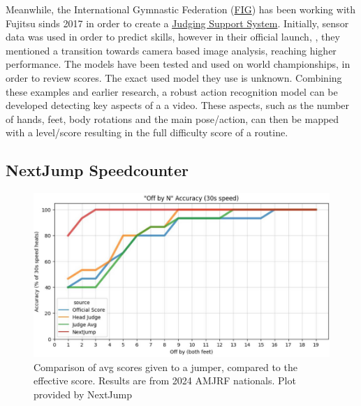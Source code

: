 Meanwhile, the International Gymnastic Federation (\href{https://www.gymnastics.sport/site/}{FIG}) has been working with Fujitsu sinds 2017 in order to create a \href{https://www.fujitsu.com/global/themes/data-driven/judging-support-system/}{Judging Support System}. Initially, sensor data was used in order to predict skills, however in their official launch, \autocite{Fujitsu2023launch}, they mentioned a transition towards camera based image analysis, reaching higher performance. The models have been tested and used on world championships, in order to review scores. The exact used model they use is unknown.
Combining these examples and earlier research, a robust action recognition model can be developed detecting key aspects of a a video. These aspects, such as the number of hands, feet, body rotations and the main pose/action, can then be mapped with a level/score resulting in the full difficulty score of a routine.

\subsection{NextJump Speedcounter}
\label{lit:nextjump-speedcounter}


\begin{figure}
    \centering
    \includegraphics[width=0.95\linewidth]{img/nextjump-off-by-feet-judges}
    \caption[nextjump-results-multi]{Comparison of avg scores given to a jumper, compared to the effective score. Results are from 2024 AMJRF nationals. Plot provided by NextJump}
    \label{fig:nextjump-results-off-by-feet-judges-amjrf-2024}
\end{figure}

